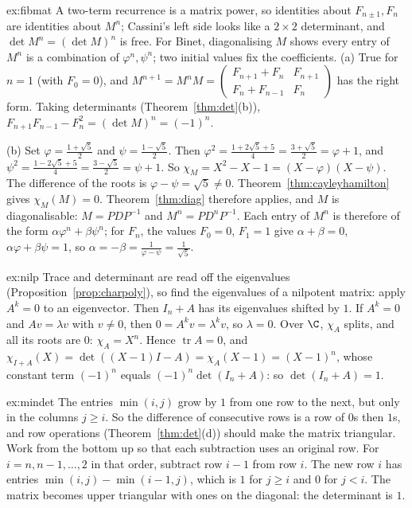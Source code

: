 \begin{solution}{ex:fibmat}
\idea A two-term recurrence is a matrix power, so identities about $F_{n\pm1},F_n$ are identities about $M^n$; Cassini's left side looks like a $2\times2$ determinant, and $\det M^n=(\det M)^n$ is free. For Binet, diagonalising $M$ shows every entry of $M^n$ is a combination of $\varphi^n,\psi^n$; two initial values fix the coefficients.
\writeup (a) True for $n=1$ (with $F_0=0$), and $M^{n+1}=M^nM=\begin{pmatrix}F_{n+1}+F_n&F_{n+1}\\F_n+F_{n-1}&F_n\end{pmatrix}$ has the right form.
Taking determinants (Theorem~\ref{thm:det}(b)), $F_{n+1}F_{n-1}-F_n^2=(\det M)^n=(-1)^n$.

(b) Set $\varphi=\frac{1+\sqrt5}2$ and $\psi=\frac{1-\sqrt5}2$. Then $\varphi^2=\frac{1+2\sqrt5+5}4=\frac{3+\sqrt5}2=\varphi+1$, and $\psi^2=\frac{1-2\sqrt5+5}4=\frac{3-\sqrt5}2=\psi+1$. So $\chi_M=X^2-X-1=(X-\varphi)(X-\psi)$. The difference of the roots is $\varphi-\psi=\sqrt5\ne0$. Theorem~\ref{thm:cayleyhamilton} gives $\chi_M(M)=0$. Theorem~\ref{thm:diag} therefore applies, and $M$ is diagonalisable: $M=PDP^{-1}$ and $M^n=PD^nP^{-1}$. Each entry of $M^n$ is therefore of the form
$\alpha\varphi^n+\beta\psi^n$; for $F_n$, the values $F_0=0$, $F_1=1$ give $\alpha+\beta=0$, $\alpha\varphi+\beta\psi=1$, so $\alpha=-\beta=\frac1{\varphi-\psi}=\frac1{\sqrt5}$.
\end{solution}

\begin{solution}{ex:nilp}
\idea Trace and determinant are read off the eigenvalues (Proposition~\ref{prop:charpoly}), so find the eigenvalues of a nilpotent matrix: apply $A^k=0$ to an eigenvector. Then $I_n+A$ has its eigenvalues shifted by $1$.
\writeup If $A^k=0$ and $Av=\lambda v$ with $v\ne0$, then $0=A^kv=\lambda^kv$, so $\lambda=0$. Over $\C$, $\chi_A$ splits, and all its roots are $0$: $\chi_A=X^n$. Hence
$\operatorname{tr}A=0$, and $\chi_{I+A}(X)=\det((X-1)I-A)=\chi_A(X-1)=(X-1)^n$, whose constant term $(-1)^n$ equals $(-1)^n\det(I_n+A)$: so $\det(I_n+A)=1$.
\end{solution}

\begin{solution}{ex:mindet}
\idea The entries $\min(i,j)$ grow by $1$ from one row to the next, but only in the columns $j\ge i$. So the difference of consecutive rows is a row of $0$s then $1$s, and row operations (Theorem~\ref{thm:det}(d)) should make the matrix triangular. Work from the bottom up so that each subtraction uses an original row.
\writeup For $i=n,n-1,\dots,2$ in that order, subtract row $i-1$ from row $i$. The new row $i$ has entries $\min(i,j)-\min(i-1,j)$, which is $1$ for $j\ge i$ and $0$ for $j<i$.
The matrix becomes upper triangular with ones on the diagonal: the determinant is $1$.
\end{solution}

